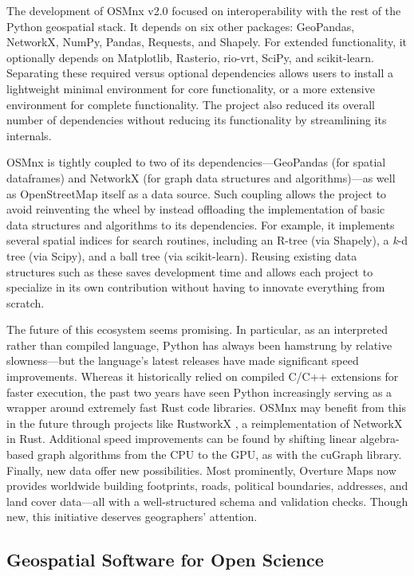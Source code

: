 \documentclass[12pt,letterpaper]{article} %
\begin{document}
The development of OSMnx v2.0 focused on interoperability with the rest of the Python geospatial stack. It depends on six other packages: GeoPandas, NetworkX, NumPy, Pandas, Requests, and Shapely. For extended functionality, it optionally depends on Matplotlib, Rasterio, rio-vrt, SciPy, and scikit-learn. Separating these required versus optional dependencies allows users to install a lightweight minimal environment for core functionality, or a more extensive environment for complete functionality. The project also reduced its overall number of dependencies without reducing its functionality by streamlining its internals.

OSMnx is tightly coupled to two of its dependencies---GeoPandas (for spatial dataframes) and NetworkX (for graph data structures and algorithms)---as well as OpenStreetMap itself as a data source. Such coupling allows the project to avoid reinventing the wheel by instead offloading the implementation of basic data structures and algorithms to its dependencies. For example, it implements several spatial indices for search routines, including an R-tree (via Shapely), a \textit{k}-d tree (via Scipy), and a ball tree (via scikit-learn). Reusing existing data structures such as these saves development time and allows each project to specialize in its own contribution without having to innovate everything from scratch.

The future of this ecosystem seems promising. In particular, as an interpreted rather than compiled language, Python has always been hamstrung by relative slowness---but the language's latest releases have made significant speed improvements. Whereas it historically relied on compiled C/C++ extensions for faster execution, the past two years have seen Python increasingly serving as a wrapper around extremely fast Rust code libraries. OSMnx may benefit from this in the future through projects like RustworkX \citep{Treinish2022}, a reimplementation of NetworkX in Rust. Additional speed improvements can be found by shifting linear algebra-based graph algorithms from the CPU to the GPU, as with the cuGraph library. Finally, new data offer new possibilities. Most prominently, Overture Maps now provides worldwide building footprints, roads, political boundaries, addresses, and land cover data---all with a well-structured schema and validation checks. Though new, this initiative deserves geographers' attention.

\subsection{Geospatial Software for Open Science}
\end{document}
